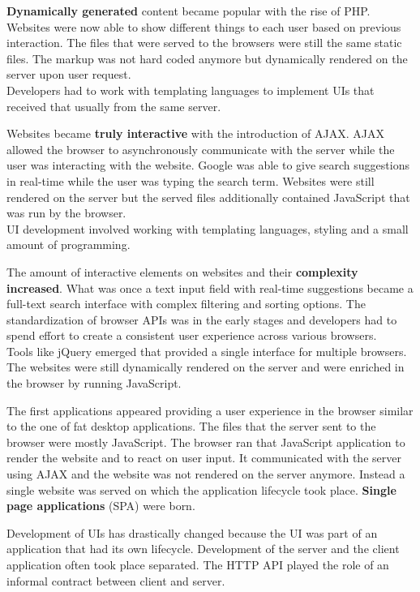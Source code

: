 \textbf{Dynamically generated} content became popular with the rise of PHP. Websites were now able to show different things to each user based on previous interaction. The files that were served to the browsers were still the same static files. The markup was not hard coded anymore but dynamically rendered on the server upon user request.
\\ Developers had to work with templating languages to implement UIs that received that usually from the same server.

Websites became \textbf{truly interactive} with the introduction of AJAX. AJAX allowed the browser to asynchronously communicate with the server while the user was interacting with the website. Google was able to give search suggestions in real-time while the user was typing the search term. Websites were still rendered on the server but the served files additionally contained JavaScript that was run by the browser.
\\ UI development involved working with templating languages, styling and a small amount of programming.

The amount of interactive elements on websites and their \textbf{complexity increased}. What was once a text input field with real-time suggestions became a full-text search interface with complex filtering and sorting options. The standardization of browser APIs was in the early stages and developers had to spend effort to create a consistent user experience across various browsers.
\\ Tools like jQuery emerged that provided a single interface for multiple browsers. The websites were still dynamically rendered on the server and were enriched in the browser by running JavaScript.

The first applications appeared providing a user experience in the browser similar to the one of fat desktop applications. The files that the server sent to the browser were mostly JavaScript. The browser ran that JavaScript application to render the website and to react on user input. It communicated with the server using AJAX and the website was not rendered on the server anymore. Instead a single website was served on which the application lifecycle took place. \textbf{Single page applications} (SPA) were born.
\par Development of UIs has drastically changed because the UI was part of an application that had its own lifecycle. Development of the server and the client application often took place separated. The HTTP API played the role of an informal contract between client and server.

